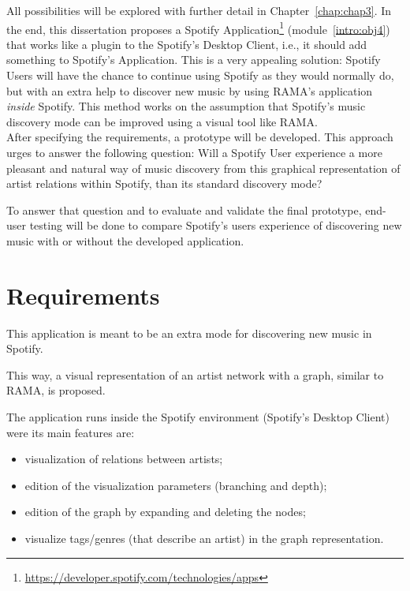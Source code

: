   All possibilities will be explored with further detail in Chapter~\ref{chap:chap3}.
  In the end, this dissertation proposes a Spotify Application\footnote{\url{https://developer.spotify.com/technologies/apps}} (module~\ref{intro:obj4}) that works like a plugin to the Spotify's Desktop Client, i.e., it should add something to Spotify's Application.
  This is a very appealing solution: Spotify Users will have the chance to continue using Spotify as they would normally do, but with an extra help to discover new music by using RAMA's application \emph{inside} Spotify. 
  This method works on the assumption that Spotify's music discovery mode can be improved using a visual tool like RAMA. \\

  After specifying the requirements, a prototype will be developed.
  This approach urges to answer the following question: Will a Spotify User experience a more pleasant and natural way of music discovery from this graphical representation of artist relations within Spotify, than its standard discovery mode?

  To answer that question and to evaluate and validate the final prototype, end-user testing will be done to compare Spotify's users experience of discovering new music with or without the developed application.


\section{Requirements}
\label{sec:requirements}

  This application is meant to be an extra mode for discovering new music in Spotify.

  This way, a visual representation of an artist network with a graph, similar to RAMA, is proposed.

  The application runs inside the Spotify environment (Spotify's Desktop Client) were its main features are: 

  \begin{itemize}
    \item visualization of relations between artists;
    \item edition of the visualization parameters (branching and depth);
    \item edition of the graph by expanding and deleting the nodes;
    \item visualize tags/genres (that describe an artist) in the graph representation.
  \end{itemize}

